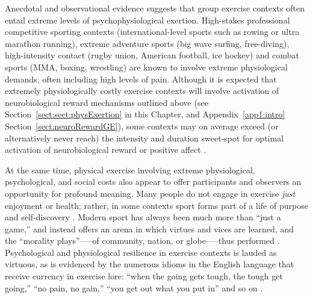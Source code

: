 \begin{CJK}{UTF8}{gbsn}

Anecdotal and observational evidence suggests that group exercise contexts often entail extreme levels of psychophysiological exertion.  High-stakes professional competitive sporting contexts (international-level sports such as rowing or ultra marathon running), extreme adventure sports (big wave surfing, free-diving), high-intensity contact (rugby union, American football, ice hockey) and combat sports (MMA, boxing, wrestling) are known to involve extreme physiological demands, often including high levels of pain.  Although it is expected that extremely physiologically costly exercise contexts will involve activation of neurobiological reward mechanisms outlined above (see Section~\ref{sect:sect:physExertion} in this Chapter, and Appendix~\ref{app1:intro} Section~\ref{sect:neuroRewardGE}), some contexts may on average exceed (or alternatively never reach) the intensity and duration sweet-spot for optimal activation of neurobiological reward \citep{Raichlen2013} or positive affect \citep{Ekkekakis2011,Reed2006}.

At the same time, physical exercise involving extreme physiological, psychological, and social costs also appear to offer participants and observers an opportunity for profound meaning.  Many people do not engage in exercise \textit{just} enjoyment or health; rather, in some contexts sport forms part of a life of purpose and self-discovery \citep[see, for example][]{Jackson1995,Jones2004,White2011}.  Modern sport has always been much more than ``just a game,'' and instead offers an arena in which virtues and vices are learned, and the ``morality plays''—--of community, nation, or globe—--thus performed \citep{Elias1986,McNamee2008}.  Psychological and physiological resilience in exercise contexts is lauded as virtuous, as is evidenced by the numerous idioms in the English language that receive currency in exercise lore: ``when the going gets tough, the tough get going,'' ``no pain, no gain,'' ``you get out what you put in'' and so on \citep{Sarkar2014}.


\end{CJK}
